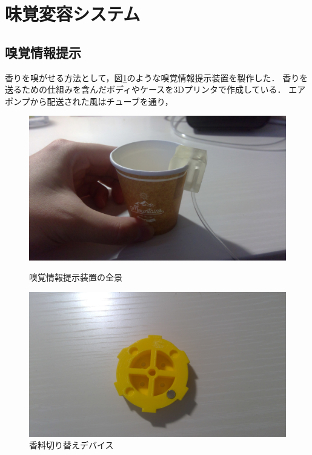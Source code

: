 \section{味覚変容システム}


\subsection{嗅覚情報提示}
香りを嗅がせる方法として，図\ref{all}のような嗅覚情報提示装置を製作した．
香りを送るための仕組みを含んだボディやケースを3Dプリンタで作成している．
エアポンプから配送された風はチューブを通り，


\begin{figure}[t]
  \includegraphics[width = 1.0\columnwidth]{figs/cup.jpg}
  \caption{嗅覚情報提示装置の全景}
  \label{all}
\end{figure}

\begin{figure}[t]
  \includegraphics[width = 1.0\columnwidth]{figs/dial.jpg}
  \caption{香料切り替えデバイス}
  \label{device}
\end{figure}

